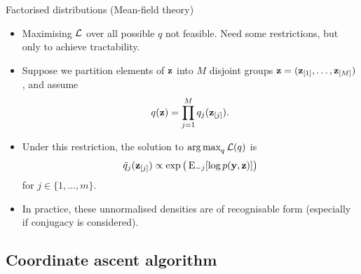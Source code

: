 \begin{frame}{Factorised distributions (Mean-field theory)}
  \begin{itemize}
    \item<1-> Maximising ${\mathcal L}$ over all possible $q$ not feasible. Need some restrictions, but only to achieve tractability.
    \item<1-> Suppose we partition elements of ${\mathbf z}$ into $M$ disjoint groups ${\mathbf z} = ({\mathbf z}_{[1]}, \dots, {\mathbf z}_{[M]})$, and assume
    \[
      q({\mathbf z}) = \prod_{j=1}^M q_j({\mathbf z}_{[j]}).
    \]
    \item<2-> Under this restriction, the solution to $\operatorname*{arg\,max}_q {\mathcal L}(q)$ is
    \begin{align}\label{eq:meanfieldsoln}
      \tilde q_j({\mathbf z}_{[j]}) \propto \exp\big(\operatorname{E}_{-j}[\log p({\mathbf y},{\mathbf z})]\big)
    \end{align}
    for $j \in \{1,\dots,m\}$.
    \item<3-> In practice, these unnormalised densities are of recognisable form (especially if conjugacy is considered).
    \vspace{4pt}
  \end{itemize}
\end{frame}

\subsection{Coordinate ascent algorithm}

